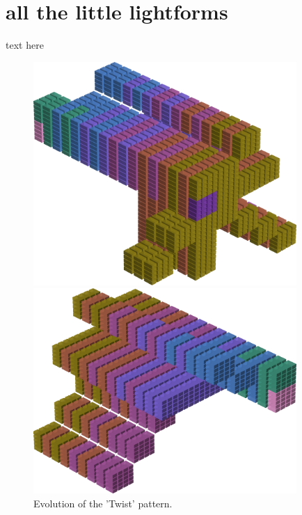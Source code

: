 \chapter{all the little lightforms} 
\label{sec:patterns}
\rhead[]{\leftmark}
\lstset{style=6502Style}
\lstset{ 
   aboveskip=5pt,
   belowskip=0pt,
}

text here
\clearpage

\begin{figure}[H]
    \centering
    \begin{adjustbox}{width=10cm,center}
      \includegraphics[width=10cm]{src/colorspace_patterns/pattern0-45.png}%
    \end{adjustbox}
    \begin{adjustbox}{width=10cm}
      \includegraphics[width=10cm]{src/colorspace_patterns/pattern0-225.png}%
    \end{adjustbox}
\caption{Evolution of the 'Twist' pattern.}
\end{figure}
\clearpage

